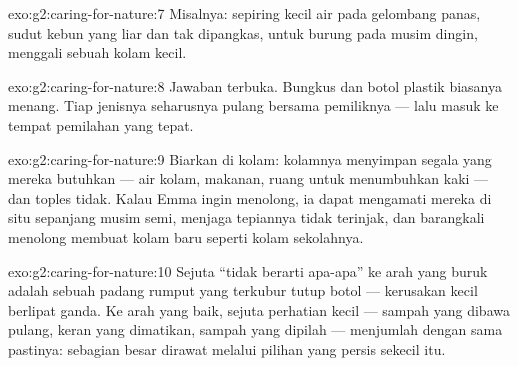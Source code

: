 \begin{solution}{exo:g2:caring-for-nature:7}
Misalnya: sepiring kecil air pada gelombang panas, sudut kebun yang
liar dan tak dipangkas,  untuk burung pada musim dingin, menggali
sebuah kolam kecil.
\end{solution}

\begin{solution}{exo:g2:caring-for-nature:8}
Jawaban terbuka. Bungkus dan botol plastik biasanya menang. Tiap
jenisnya seharusnya pulang bersama pemiliknya --- lalu masuk ke tempat
pemilahan yang tepat.
\end{solution}

\begin{solution}{exo:g2:caring-for-nature:9}
Biarkan  di kolam: kolamnya menyimpan segala yang mereka
butuhkan --- air kolam, makanan, ruang untuk menumbuhkan kaki --- dan
toples tidak. Kalau Emma ingin menolong, ia dapat mengamati mereka di
situ sepanjang musim semi, menjaga tepiannya tidak terinjak, dan
barangkali menolong membuat  kolam baru seperti kolam sekolahnya.
\end{solution}

\begin{solution}{exo:g2:caring-for-nature:10}
Sejuta ``tidak berarti apa-apa'' ke arah yang buruk adalah sebuah
padang rumput yang terkubur tutup botol --- kerusakan kecil berlipat
ganda. Ke arah yang baik, sejuta perhatian kecil --- sampah yang
dibawa pulang, keran yang dimatikan, sampah yang dipilah ---
menjumlah dengan sama pastinya:  sebagian besar dirawat melalui
pilihan yang persis sekecil itu.
\end{solution}
